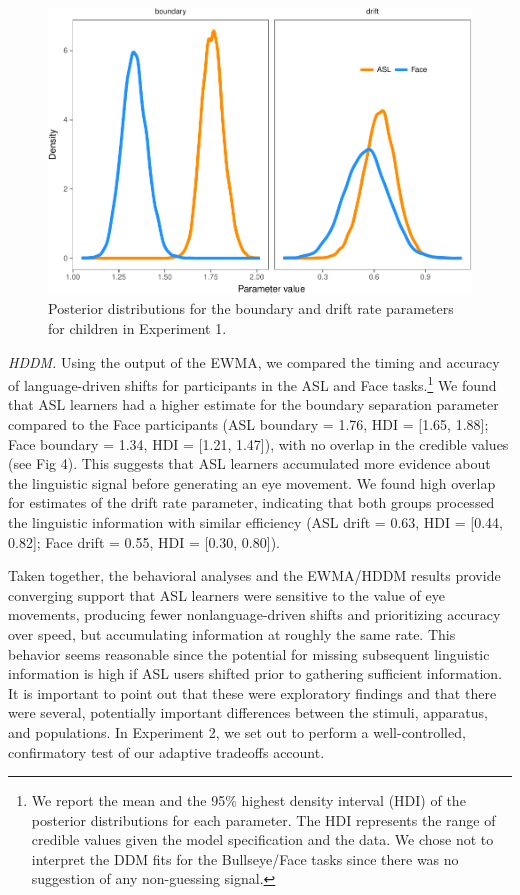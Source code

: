 \documentclass[english,man]{apa6}
\theoremstyle{definition}
\theoremstyle{definition}
\theoremstyle{definition}
\theoremstyle{remark}
\begin{document}
\begin{figure}[tb]

{\centering \includegraphics[width=0.8\linewidth]{figs/trio-hddm-plot-1} 

}

\caption{Posterior distributions for the boundary and drift rate parameters for children in Experiment 1.}\label{fig:trio-hddm-plot}
\end{figure}

\emph{HDDM.} Using the output of the EWMA, we compared the timing and
accuracy of language-driven shifts for participants in the ASL and Face
tasks.\footnote{We report the mean and the 95\% highest density interval
  (HDI) of the posterior distributions for each parameter. The HDI
  represents the range of credible values given the model specification
  and the data. We chose not to interpret the DDM fits for the
  Bullseye/Face tasks since there was no suggestion of any non-guessing
  signal.} We found that ASL learners had a higher estimate for the
boundary separation parameter compared to the Face participants (ASL
boundary = 1.76, HDI = {[}1.65, 1.88{]}; Face boundary = 1.34, HDI =
{[}1.21, 1.47{]}), with no overlap in the credible values (see Fig 4).
This suggests that ASL learners accumulated more evidence about the
linguistic signal before generating an eye movement. We found high
overlap for estimates of the drift rate parameter, indicating that both
groups processed the linguistic information with similar efficiency (ASL
drift = 0.63, HDI = {[}0.44, 0.82{]}; Face drift = 0.55, HDI = {[}0.30,
0.80{]}).

Taken together, the behavioral analyses and the EWMA/HDDM results
provide converging support that ASL learners were sensitive to the value
of eye movements, producing fewer nonlanguage-driven shifts and
prioritizing accuracy over speed, but accumulating information at
roughly the same rate. This behavior seems reasonable since the
potential for missing subsequent linguistic information is high if ASL
users shifted prior to gathering sufficient information. It is important
to point out that these were exploratory findings and that there were
several, potentially important differences between the stimuli,
apparatus, and populations. In Experiment 2, we set out to perform a
well-controlled, confirmatory test of our adaptive tradeoffs account.
\end{document}

